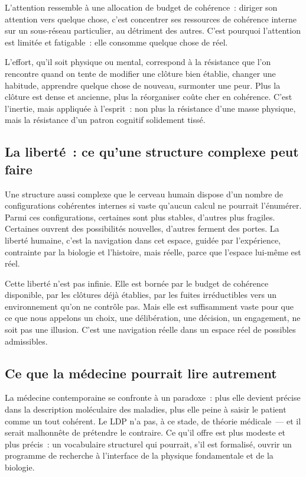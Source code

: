\documentclass[12pt, a4paper, openright]{book}
\begin{document}
L'attention ressemble à une allocation de budget de cohérence~: diriger son attention vers quelque chose, c'est concentrer ses ressources de cohérence interne sur un sous-réseau particulier, au détriment des autres. C'est pourquoi l'attention est limitée et fatigable~: elle consomme quelque chose de réel.

\medskip

L'effort, qu'il soit physique ou mental, correspond à la résistance que l'on rencontre quand on tente de modifier une clôture bien établie, changer une habitude, apprendre quelque chose de nouveau, surmonter une peur. Plus la clôture est dense et ancienne, plus la réorganiser coûte cher en cohérence. C'est l'inertie, mais appliquée à l'esprit~: non plus la résistance d'une masse physique, mais la résistance d'un patron cognitif solidement tissé.

\subsection*{La liberté~: ce qu'une structure complexe peut faire}

Une structure aussi complexe que le cerveau humain dispose d'un nombre de configurations cohérentes internes si vaste qu'aucun calcul ne pourrait l'énumérer. Parmi ces configurations, certaines sont plus stables, d'autres plus fragiles. Certaines ouvrent des possibilités nouvelles, d'autres ferment des portes. La liberté humaine, c'est la navigation dans cet espace, guidée par l'expérience, contrainte par la biologie et l'histoire, mais réelle, parce que l'espace lui-même est réel.

\medskip

Cette liberté n'est pas infinie. Elle est bornée par le budget de cohérence disponible, par les clôtures déjà établies, par les fuites irréductibles vers un environnement qu'on ne contrôle pas. Mais elle est suffisamment vaste pour que ce que nous appelons un choix, une délibération, une décision, un engagement, ne soit pas une illusion. C'est une navigation réelle dans un espace réel de possibles admissibles.

\subsection*{Ce que la médecine pourrait lire autrement}

La médecine contemporaine se confronte à un paradoxe~: plus elle devient précise dans la description moléculaire des maladies, plus elle peine à saisir le patient comme un tout cohérent. Le LDP n'a pas, à ce stade, de théorie médicale~--- et il serait malhonnête de prétendre le contraire. Ce qu'il offre est plus modeste et plus précis~: un vocabulaire structurel qui pourrait, s'il est formalisé, ouvrir un programme de recherche à l'interface de la physique fondamentale et de la biologie.
\end{document}
